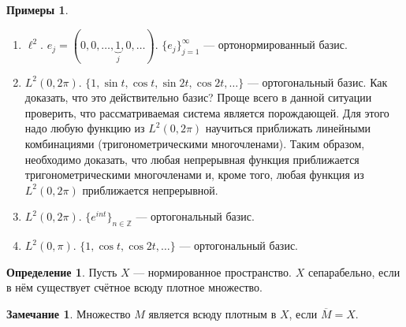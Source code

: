 \documentclass[11pt,openany,a4paper]{scrartcl}
\theoremstyle{plain}
\theoremstyle{definition}
\newtheorem{definition}[theorem]{Определение}
\newtheorem{remark}[theorem]{Замечание}
\newtheorem{examples}[theorem]{Примеры}
\newcommand\mb{\mathbb}
\newcommand\ol{\overline}
\begin{document}
\begin{examples}
\mbox{}
    \begin{enumerate}
        \item $\ell^2$. $e_j =
        (0, 0, \ldots, \underbrace{1}_j, 0, \ldots)$.
        $\{e_j\}_{j=1}^\infty$ — ортонормированный базис.
        \item $L^2(0, 2\pi)$.
        $\{1, \sin t, \cos t, \sin 2t, \cos 2t, \ldots\}$ —
        ортогональный базис. Как доказать, 
        что это действительно базис? Проще всего в данной ситуации проверить, что
        рассматриваемая система является порождающей. Для этого надо любую функцию
        из $L^2(0, 2\pi)$ научиться приближать линейными комбинациями
        (тригонометрическими многочленами). Таким образом, необходимо доказать, 
        что любая непрерывная функция приближается тригонометрическими 
        многочленами и, кроме того, любая функция из $L^2(0, 2\pi)$ приближается
        непрерывной.
        \item $L^2(0, 2\pi)$. $\{e^{int}\}_{n \in \mb Z}$ — ортогональный базис.
        \item $L^2(0, \pi)$. $\{1,\cos t, \cos 2t, \ldots\}$ — ортогональный 
        базис.
    \end{enumerate}
\end{examples}

\begin{definition}
    Пусть $X$ — нормированное пространство. $X$ сепарабельно, если в нём 
    существует счётное всюду плотное множество.
\end{definition}
\begin{remark}
    Множество $M$ является всюду плотным в $X$, если $\ol M = X$.
\end{remark}
\end{document}
